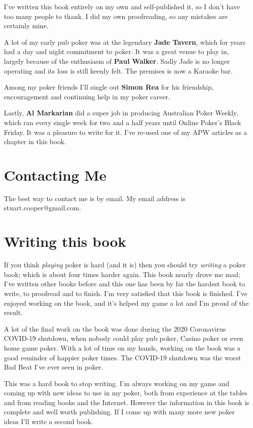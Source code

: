 I've written this book entirely on my own and self-published it, so I don't
have too many people to thank. I did my own proofreading, so any mistakes
are certainly mine.

A lot of my early pub poker was at the legendary \textbf{Jade Tavern},
which for years had a day and night commitment to poker.
It was a great venue to play in, largely because of the enthusiasm
of \textbf{Paul Walker}. Sadly Jade is no longer operating and
its loss is still keenly felt. The premises is now a Karaoke bar.

Among my poker friends I'll single out \textbf{Simon Rea} for his friendship,
encouragement and continuing help in my poker career.

Lastly, \textbf{Al Markarian} did a super job in producing Australian
Poker Weekly, which ran every single week for two and a half years
until Online Poker's Black Friday. It was a pleasure to write for
it. I've re-used one of my APW articles as a chapter in this book.

\section{Contacting Me}

The best way to contact me is by email. My email address
is stuart.cooper@gmail.com.

\section{Writing this book}

If you think \textit{playing} poker is hard (and it is) then you should try
\textit{writing} a poker book; which is about four times harder
again. This book nearly drove me mad; I've written other books before
and this one has been by far the hardest book to write, to proofread
and to finish. I'm very satisfied that this book is finished. I've
enjoyed working on the book, and it's helped my game a lot and I'm
proud of the result.

A lot of the final work on the book was done during the 2020
Coronavirus COVID-19 shutdown, when nobody could play pub poker,
Casino poker or even home game poker. With a lot of time on my hands,
working on the book was a good reminder of happier poker times. The
COVID-19 shutdown was the worst Bad Beat I've ever seen in poker.

This was a hard book to stop writing. I'm always working on my game
and coming up with new ideas to use in my poker, both from experience
at the tables and from reading books and the Internet. However the
information in this book is complete and well worth
publishing. If I come up with many more new poker ideas I'll write
a second book.

